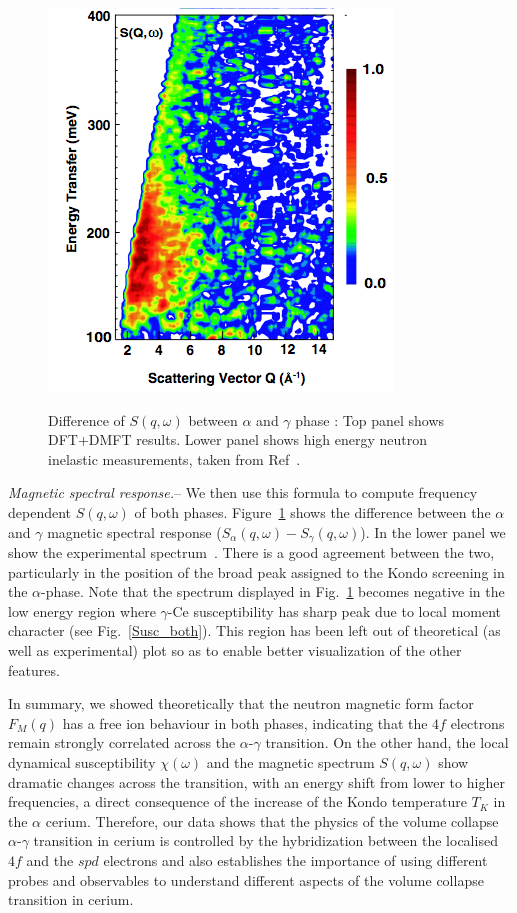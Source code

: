 \documentclass[10pt]{ruthesis}
\begin{document}
{\begin{figure}[t]
{\includegraphics[width=0.5 \columnwidth]{Fig3b.png}
}
\caption{Difference of $S(q,\omega)$ between $\alpha$ and $\gamma$ phase :
  Top panel shows DFT+DMFT  results. Lower panel shows high energy neutron
  inelastic measurements, taken from Ref~\cite{murani}.
  }
\label{Sq}
\end{figure}
%

{\it Magnetic spectral response.}-- We then use this formula to
compute frequency dependent $S(q,\omega)$ of both phases.
%
% 
Figure~\ref{Sq} shows the difference between the $\alpha$ and $\gamma$
magnetic spectral response ($S_\alpha(q,\omega)-S_\gamma(q,\omega)$).
In the lower panel we show the
experimental spectrum~\cite{murani}. There is a good agreement between
the two, particularly in the position of the broad peak assigned to
the Kondo screening in the $\alpha$-phase.  Note that the spectrum
displayed in Fig.~\ref{Sq} becomes negative in the low energy region
where $\gamma$-Ce susceptibility has sharp peak due to local moment character
(see Fig.~\ref{Susc_both}).  This region has been left out of
theoretical (as well as experimental) plot so as to enable better
visualization of the other features.



In summary, we showed theoretically that the neutron magnetic form
factor $F_M(q)$ has a free ion behaviour in both phases, indicating
that the $4f$ electrons remain strongly correlated across the
$\alpha$-$\gamma$ transition.  On the other hand, the local dynamical
susceptibility $\chi(\omega)$ and the magnetic spectrum $S(q,\omega)$
show dramatic changes across the transition, with an energy shift from
lower to higher frequencies, a direct consequence of the increase of
the Kondo temperature $T_K$ in the $\alpha$ cerium.  Therefore, our
data shows that the physics of the volume collapse $\alpha$-$\gamma$
transition in cerium is controlled by the hybridization between the
localised $4f$ and the $spd$ electrons and also establishes the
importance of using different probes and observables to understand
different aspects of the volume collapse transition in cerium.

}
\end{document}
